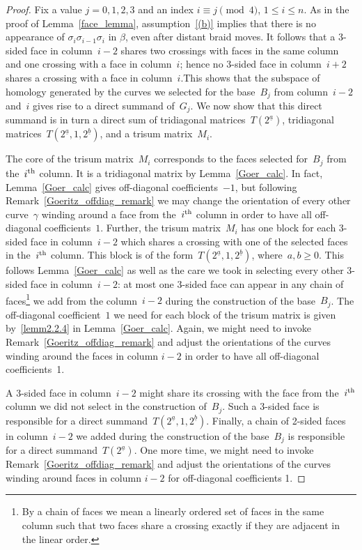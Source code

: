 \documentclass[AHL,Unicode,longabstracts,published]{cedram}
\begin{document}
\begin{proof}
Fix a value $j=0,1,2,3$ and an index $i \equiv j \pmod 4$, $1 \le i \le n$. As in the proof of Lemma~\ref{face_lemma}, assumption~\eqref{(b)} implies that there is no appearance of $\sigma_{i}\sigma_{i-1}\sigma_{i}$ in $\beta$, even after distant braid moves. It follows that a 3-sided face in column~$i-2$ shares two crossings with faces in the same column and one crossing with a face in column~$i$; hence no 3-sided face in column~$i+2$ shares a crossing with a face in column~$i$.This shows that the subspace of homology generated by the curves we selected for the base~$B_j$ from column~$i-2$ and~$i$ gives rise to a direct summand of~$G_j$. We now show that this direct summand is in turn a direct sum of tridiagonal matrices~$T(2^{\underline a})$, tridiagonal matrices~$T(2^{\underline a},1,2^{\underline b})$, and a trisum matrix~$M_i$.


The core of the trisum matrix~$M_i$ corresponds to the faces selected for~$B_j$ from the~$i^{\rm th}$ column. It is a tridiagonal matrix by Lemma~\ref{Goer_calc}. In fact, Lemma~\ref{Goer_calc} gives off-diagonal coefficients~$-1$, but following Remark~\ref{Goeritz_offdiag_remark} we may change the orientation of every other curve~$\gamma$ winding around a face from the~$i^{\rm th}$ column in order to have all off-diagonal coefficients~$1$. Further, the trisum matrix~$M_i$ has one block for each 3-sided face in column~$i - 2$ which shares a crossing with one of the selected faces in the~$i^{\rm th}$ column. This block is of the form~$T(2^{\underline a},1,2^{\underline b})$, where~$a,b\ge0$. This follows Lemma~\ref{Goer_calc} as well as the care we took in selecting every other 3-sided face in column~$i - 2$: at most one 3-sided face can appear in any chain of faces\footnote{By a chain of faces we mean a linearly ordered set of faces in the same column such that two faces share a crossing exactly if they are adjacent in the linear order.} we add from the column~$i-2$ during the construction of the base~$B_j$. The off-diagonal coefficient~$1$ we need for each block of the trisum matrix is given by~\eqref{lemm2.2.4} in Lemma~\ref{Goer_calc}. Again, we might need to invoke Remark~\ref{Goeritz_offdiag_remark} and adjust the orientations of the curves winding around the faces in column $i-2$ in order to have all off-diagonal coefficients~1.


A 3-sided face in column~$i-2$ might share its crossing with the face from the~$i^{\rm th}$ column we did not select in the construction of~$B_j$. Such a 3-sided face is responsible for a direct summand~$T(2^{\underline a},1,2^{\underline b})$. Finally, a chain of 2-sided faces in column~$i-2$ we added during the construction of the base~$B_j$ is responsible for a direct summand~$T(2^{\underline a})$. One more time, we might need to invoke Remark~\ref{Goeritz_offdiag_remark} and adjust the orientations of the curves winding around faces in column $i-2$ for off-diagonal coefficients 1.
\end{proof}
\end{document}

